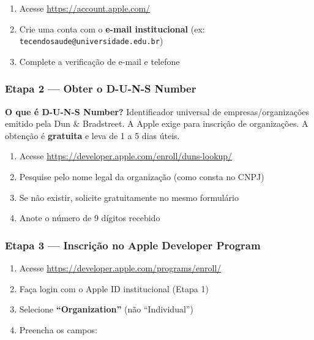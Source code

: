 \documentclass[12pt, a4paper]{article}
\begin{document}
\begin{enumerate}
  \item Acesse \url{https://account.apple.com/}
  \item Crie uma conta com o \textbf{e-mail institucional} (ex: \texttt{tecendosaude@universidade.edu.br})
  \item Complete a verifica\c{c}\~ao de e-mail e telefone
\end{enumerate}

\subsubsection{Etapa 2 --- Obter o D-U-N-S Number}
\label{sec:duns}

\begin{caixanota}
  \textbf{O que \'e D-U-N-S Number?} Identificador universal de empresas/organiza\c{c}\~oes emitido pela Dun \& Bradstreet. A Apple exige para inscri\c{c}\~ao de organiza\c{c}\~oes. A obten\c{c}\~ao \'e \textbf{gratuita} e leva de 1 a 5 dias \'uteis.
\end{caixanota}

\begin{enumerate}
  \item Acesse \url{https://developer.apple.com/enroll/duns-lookup/}
  \item Pesquise pelo nome legal da organiza\c{c}\~ao (como consta no CNPJ)
  \item Se n\~ao existir, solicite gratuitamente no mesmo formul\'ario
  \item Anote o n\'umero de 9 d\'igitos recebido
\end{enumerate}

\subsubsection{Etapa 3 --- Inscri\c{c}\~ao no Apple Developer Program}

\begin{enumerate}
  \item Acesse \url{https://developer.apple.com/programs/enroll/}
  \item Fa\c{c}a login com o Apple ID institucional (Etapa 1)
  \item Selecione \textbf{``Organization''} (n\~ao ``Individual'')
  \item Preencha os campos:
\end{enumerate}
\end{document}
